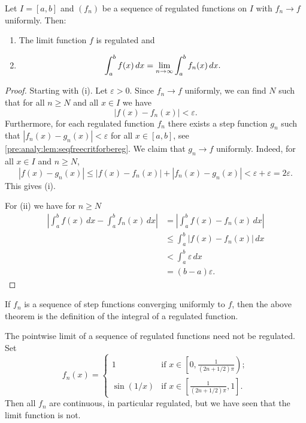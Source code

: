 \documentclass[10pt, a4paper]{article}
\begin{document}
\begin{theorem}\label{pre:analy:thm:seqofreghasprops}
    Let $I = [a, b]$ and $(f_n)$ be a sequence of regulated functions on $I$ with $f_n \rightarrow f$ uniformly.
    Then:
    \begin{enumerate}[label = (\roman*)]
        \item The limit function $f$ is regulated and
        
        \item
        \[
        \int_{a}^{b}f(x)\,dx = \lim_{n \rightarrow \infty}\int_{a}^{b}f_n(x)\,dx.
        \]
    \end{enumerate}
    \begin{proof}
        Starting with (i).
        Let $\varepsilon > 0$.
        Since $f_n \rightarrow f$ uniformly,
        we can find $N$ such that for all $n \geq N$ and all $x \in I$ we have
        \[
        |f(x) - f_n(x)| < \varepsilon.
        \]
        Furthermore,
        for each regulated function $f_n$ there exists a step function $g_n$ such that $|f_n(x) - g_n(x)| < \varepsilon$ for all $x \in [a, b]$,
        see \autoref{pre:analy:lem:seqfreecritforbereg}.
        We claim that $g_n \rightarrow f$ uniformly.
        Indeed,
        for all $x \in I$ and $n \geq N$,
        \[
        |f(x) - g_n(x)| \leq |f(x) - f_n(x)| + |f_n(x) - g_n(x)| < \varepsilon + \varepsilon = 2\varepsilon.
        \]
        This gives (i).

        For (ii) we have for $n \geq N$
        \begin{align*}
            \left|\int_{a}^{b}f(x)\,dx - \int_{a}^{b}f_n(x)\,dx\right| &= \left|\int_{a}^{b}f(x) - f_n(x)\,dx\right| \\
            &\leq \int_{a}^{b}|f(x) - f_n(x)|\,dx \\
            &< \int_{a}^{b}\varepsilon\,dx \\
            &= (b - a)\varepsilon.
        \end{align*}
    \end{proof}
\end{theorem}

\begin{remark}
    If $f_n$ is a sequence of step functions converging uniformly to $f$,
    then the above theorem is the definition of the integral of a regulated function.
\end{remark}

\begin{remark}
    The pointwise limit of a sequence of regulated functions need not be regulated.
    Set
    \[
    f_n(x) = \begin{cases}
        1 &\text{if } x \in \left[0, \frac{1}{(2n + 1 / 2)\pi}\right); \\
        \sin(1 / x) &\text{if } x \in \left[\frac{1}{(2n + 1 / 2)\pi}, 1\right].
    \end{cases}
    \]
    Then all $f_n$ are continuous,
    in particular regulated,
    but we have seen that the limit function is not.
\end{remark}
\end{document}
